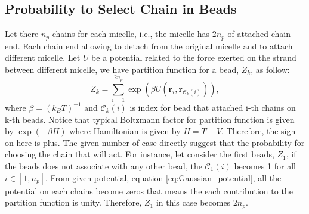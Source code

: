 \message{ !name(brief_Brownian_dynamics.tex)}\documentclass[10pt, a4paper]{report}
\begin{document}
\subsection{Probability to Select Chain in Beads}
Let there $n_p$ chains for each micelle, i.e., the micelle has $2n_p$ of attached chain end. Each chain end allowing to detach from the original micelle and to attach different micelle. Let $U$ be a potential related to the force exerted on the strand between different micelle, we have partition function for a bead, $Z_k$, as follow:
\begin{equation}
  Z_k = \sum_{i=1}^{2n_p}\exp\left(\beta U(\mathbf{r}_i, \mathbf{r}_{\mathscr{C}_k(i)})\right),
\end{equation}
where $\beta = (k_BT)^{-1}$ and $\mathscr{C}_k(i)$ is index for bead that attached i-th chains on k-th beads. Notice that typical Boltzmann factor for partition function is given by $\exp(-\beta H)$ where Hamiltonian is given by $H = T - V$. Therefore, the sign on here is plus.
The given number of case directly suggest that the probability for choosing the chain that will act. For instance, let consider the first beads, $Z_1$, if the beads does not associate with any other bead, the $\mathscr{C}_1(i)$ becomes 1 for all $i\in[1, n_p]$.
From given potential, equation \eqref{eq:Gaussian_potential}, all the potential on each chains become zeros that means the each contribution to the partition function is unity. Therefore, $Z_1$ in this case becomes $2n_p$.
\end{document}
